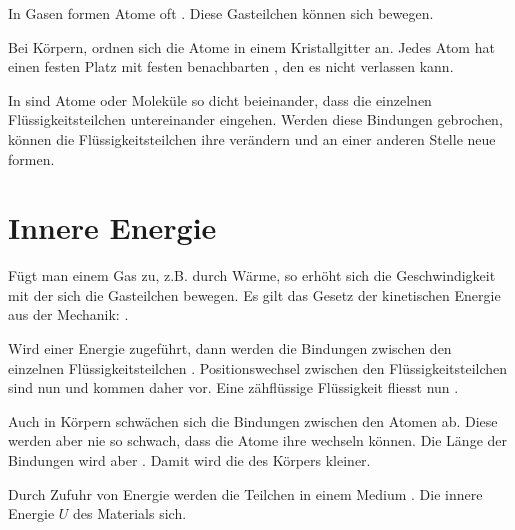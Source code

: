 \documentclass[12pt,a4paper,twoside]{article}
\begin{document}
In Gasen formen Atome oft . Diese Gasteilchen können sich  bewegen.

Bei  Körpern, ordnen sich die Atome in einem Kristallgitter an.
Jedes Atom hat einen festen Platz mit festen benachbarten , den es nicht verlassen kann.

In  sind Atome oder Moleküle so dicht beieinander, dass die einzelnen Flüssigkeitsteilchen  untereinander eingehen.
Werden diese  Bindungen gebrochen, 
können die Flüssigkeitsteilchen ihre  verändern und an einer anderen Stelle neue  formen.

\StoppLueckentext

\section*{Innere Energie}
\StartLueckentext
Fügt man einem Gas  zu, z.B. durch Wärme, so erhöht sich die Geschwindigkeit mit der sich die Gasteilchen bewegen.
Es gilt das Gesetz der kinetischen Energie aus der Mechanik: .

Wird einer  Energie zugeführt, dann werden die Bindungen zwischen den einzelnen Flüssigkeitsteilchen .
Positionswechsel zwischen den Flüssigkeitsteilchen sind nun  und kommen daher  vor.
Eine zähflüssige Flüssigkeit fliesst nun .

Auch in  Körpern schwächen sich die Bindungen zwischen den Atomen ab.
Diese werden aber nie so schwach, dass die Atome ihre  wechseln können.
Die Länge der Bindungen wird aber . Damit wird die  des Körpers kleiner.


Durch Zufuhr von Energie werden die Teilchen in einem Medium . Die innere Energie $U$ des Materials  sich.

\StoppLueckentext

\newpage


\end{document}
